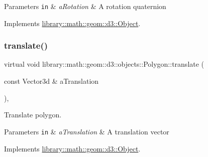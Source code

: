 \begin{DoxyParams}[1]{Parameters}
\mbox{\tt in}  & {\em a\+Rotation} & A rotation quaternion \\
\hline
\end{DoxyParams}


Implements \hyperlink{classlibrary_1_1math_1_1geom_1_1d3_1_1_object_aabefebc4960530ce6356c4445c5d490e}{library\+::math\+::geom\+::d3\+::\+Object}.

\mbox{\label{classlibrary_1_1math_1_1geom_1_1d3_1_1objects_1_1_polygon_aa0c2e161c936e39addcd783237d68090}} 
\subsubsection{\texorpdfstring{translate()}{translate()}}
{\footnotesize\ttfamily virtual void library\+::math\+::geom\+::d3\+::objects\+::\+Polygon\+::translate (\begin{DoxyParamCaption}\item[{const Vector3d \&}]{a\+Translation }\end{DoxyParamCaption})\hspace{0.3cm}{\ttfamily [override]}, {\ttfamily [virtual]}}



Translate polygon. 


\begin{DoxyParams}[1]{Parameters}
\mbox{\tt in}  & {\em a\+Translation} & A translation vector \\
\hline
\end{DoxyParams}


Implements \hyperlink{classlibrary_1_1math_1_1geom_1_1d3_1_1_object_a989723a27a7d5f6739e45ea695a6c7ed}{library\+::math\+::geom\+::d3\+::\+Object}.

\mbox{\label{classlibrary_1_1math_1_1geom_1_1d3_1_1objects_1_1_polygon_aba08898d8cb7ac1623bb56a2eee8962d}} 
